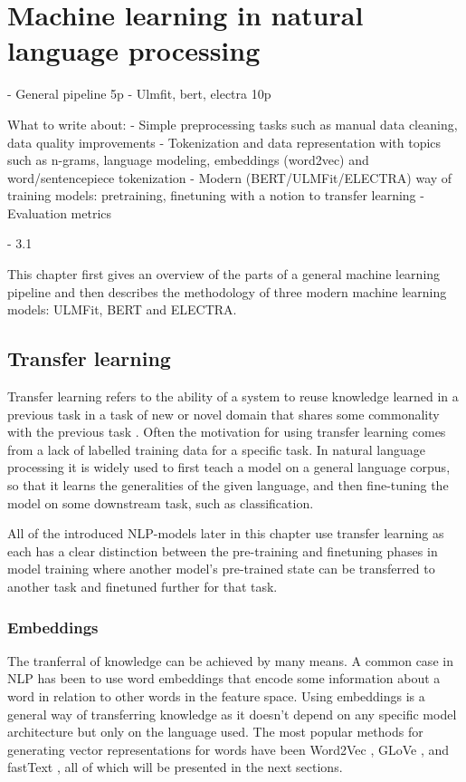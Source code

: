 \chapter{Machine learning in natural language processing} \label{Machine learning in natural language processing}

- General pipeline 5p
- Ulmfit, bert, electra 10p

What to write about:
- Simple preprocessing tasks such as manual data cleaning, data quality improvements
- Tokenization and data representation with topics such as n-grams, language modeling, embeddings (word2vec) and word/sentencepiece tokenization
- Modern (BERT/ULMFit/ELECTRA) way of training models: pretraining, finetuning with a notion to transfer learning
- Evaluation metrics

- 3.1


This chapter first gives an overview of the parts of a general machine learning pipeline and then describes the methodology of three modern machine learning models: ULMFit, BERT and ELECTRA.

\section{Transfer learning} \label{Transfer learning}
Transfer learning refers to the ability of a system to reuse knowledge learned in a previous task in a task of new or novel domain that shares some commonality with the previous task \cite{yang2020}.
Often the motivation for using transfer learning comes from a lack of labelled training data for a specific task.
In natural language processing it is widely used to first teach a model on a general language corpus, so that it learns the generalities of the given language, and then fine-tuning the model on some downstream task, such as classification.

All of the introduced NLP-models later in this chapter use transfer learning as each has a clear distinction between the pre-training and finetuning phases in model training where another model's pre-trained state can be transferred to another task and finetuned further for that task.


\subsection{Embeddings} \label{Embeddings}
The tranferral of knowledge can be achieved by many means.
A common case in NLP has been to use word embeddings that encode some information about a word in relation to other words in the feature space.
Using embeddings is a general way of transferring knowledge as it doesn't depend on any specific model architecture but only on the language used.
The most popular methods for generating vector representations for words have been Word2Vec \cite{mikolov2013}, GLoVe \cite{pennington2014}, and fastText \cite{bojanowski2017}, all of which will be presented in the next sections.

